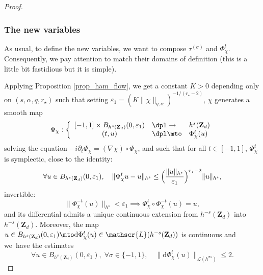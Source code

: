 \begin{proof}
\subsubsection*{The new variables}
As usual, to define the new variables, we want to compose $\tau^{(\sigma)}$ and $\Phi_\chi^t$. Consequently, we pay attention to match their domains of definition (this is a little bit fastidious but it is simple).

Applying Proposition \ref{prop_ham_flow}, we get a constant $K>0$ depending only on $(s,\alpha,q,r_\star)$ such that setting $\varepsilon_1 = (K \|\chi \|_{q,\alpha})^{-1/(r_\star-2)}$, $\chi$ generates a smooth map
\[
\Phi_\chi: \left\{ \begin{array}{cll} [-1,1] \times B_{h^s(\mathbf{Z}_d)}(0,\varepsilon_1) &\dpl\to& h^s(\mathbf{Z}_d) \\ (t,u) &\dpl\mto& \Phi_\chi^t(u) \end{array} \right.
\]
solving the equation
$
-i\partial_t \Phi_\chi = (\nabla \chi)\circ \Phi_\chi$,
and such that for all $t\in [-1,1]$, $\Phi_\chi^t$ is symplectic, close to the identity:
\begin{equation}
\label{eq_dindon_new}
\forall u \in B_{h^s(\mathbf{Z}_d)}(0,\varepsilon_1), \quad \| \Phi_\chi^t u - u \|_{h^s} \leq \Bigl(\frac{\| u \|_{h^s}}{\varepsilon_1}\Bigr)^{r_\star-2} \| u \|_{h^s},
\end{equation}
invertible:
\begin{equation}
\label{eq_invertibility_new}
\|\Phi_\chi^{-t} (u) \|_{h^s} < \varepsilon_1 \implies \Phi_\chi^{t}\circ \Phi_\chi^{-t} (u) = u,
\end{equation}
and its differential admits a unique continuous extension from $h^{-s}(\mathbf{Z}_d)$ into $h^{-s}(\mathbf{Z}_d)$. Moreover, the map $u\in B_{h^s(\mathbf{Z}_d)}(0,\varepsilon_1) \mto \mathrm{d} \Phi_\chi^t(u) \in \mathscr{L}(h^{-s}(\mathbf{Z}_d))$ is continuous and we~have the estimates
\begin{equation}
\label{eq_petanque_new}
\forall u \in B_{h^s(\mathbf{Z}_d)}(0,\varepsilon_1),\;\forall \sigma\in \{-1,1\},\quad \| \mathrm{d} \Phi_\chi^t (u)\|_{\mathscr{L}(h^{\sigma s})}\leq 2.
\end{equation}


\end{proof}
